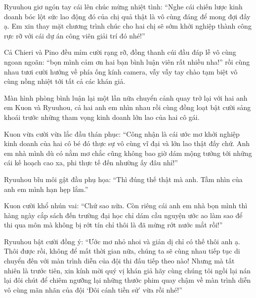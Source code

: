 \documentclass[../main.tex]{subfiles}
\begin{document}
Ryuuhou giơ ngón tay cái lên chúc mừng nhiệt tình: ``Nghe cái chiến lược kinh doanh bóc lột sức lao động đó của chị quả thật là vô cùng đáng để mong đợi đấy ạ. Em xin thay mặt chương trình chúc cho hai chị sẽ sớm khởi nghiệp thành công rực rỡ với cái dự án công viên giải trí đó nhé!''

Cả Chieri và Pino đều mỉm cười rạng rỡ, đồng thanh cúi đầu đáp lễ vô cùng ngoan ngoãn: ``bọn mình cảm ơn hai bạn bình luận viên rất nhiều nha!'' rồi cùng nhau tươi cười hướng về phía ống kính camera, vẫy vẫy tay chào tạm biệt vô cùng nồng nhiệt tới tất cả các khán giả.

Màn hình phòng bình luận lại một lần nữa chuyển cảnh quay trở lại với hai anh em Kuon và Ryuuhou, cả hai anh em nhìn nhau rồi cùng đồng loạt bật cười sảng khoái trước những tham vọng kinh doanh lớn lao của hai cô gái.

Kuon vừa cười vừa lắc đầu thán phục: ``Công nhận là cái ước mơ khởi nghiệp kinh doanh của hai cô bé đó thực sự vô cùng vĩ đại và lớn lao thật đấy chứ. Anh em nhà mình dù có nằm mơ chắc cũng không bao giờ dám mộng tưởng tới những cái kế hoạch cao xa, phi thực tế đến nhường ấy đâu nhỉ!''

Ryuuhou bĩu môi gật đầu phụ họa: ``Thì đúng thế thật mà anh. Tầm nhìn của anh em mình hạn hẹp lắm.''

Kuon cười khổ nhún vai: ``Chứ sao nữa. Còn riêng cái anh em nhà bọn mình thì hàng ngày cắp sách đến trường đại học chỉ dám cầu nguyện ước ao làm sao để thi qua môn mà không bị rớt tín chỉ thôi là đã mừng rớt nước mắt rồi!''

Ryuuhou bật cười đồng ý: ``Ước mơ nhỏ nhoi và giản dị chỉ có thế thôi anh ạ. Thôi được rồi, không để mất thời gian nữa, chúng ta sẽ cùng nhau tiếp tục di chuyển đến với màn trình diễn của đội thi đấu tiếp theo nào! Nhưng mà tất nhiên là trước tiên, xin kính mời quý vị khán giả hãy cùng chúng tôi ngồi lại nán lại đôi chút để chiêm ngưỡng lại những thước phim quay chậm về màn trình diễn vô cùng mãn nhãn của đội `Đôi cánh tiền sử' vừa rồi nhé!''
\end{document}
